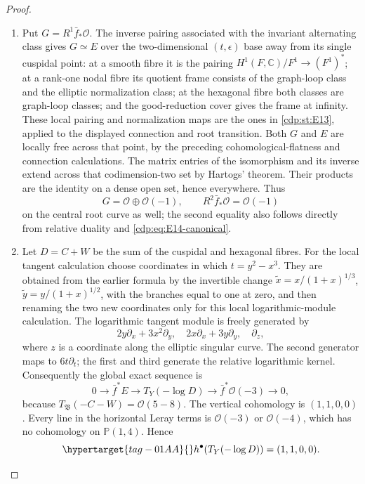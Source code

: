\begin{proof}
\begin{enumerate}[label=\arabic*.,leftmargin=*]
\item Put $G=R^1\bar f_*\mathcal O$. The inverse pairing associated with the invariant alternating
class gives $G\simeq E$ over the two-dimensional $(t,\epsilon)$
base away from its single cuspidal point: at a smooth fibre it is the pairing
$H^1(F,\mathbb C)/F^1\to(F^1)^*$; at a rank-one nodal fibre its quotient
frame consists of the graph-loop class and the elliptic normalization
class; at the hexagonal fibre both classes are graph-loop classes;
and the good-reduction cover gives the frame at infinity.
These local pairing and normalization maps are the ones in
\ref{cdp:st:E13}, applied to the displayed connection and root transition. Both $G$ and $E$ are locally free across that point, by the
preceding cohomological-flatness and connection calculations.
The matrix entries of the isomorphism and its inverse extend
across that codimension-two set by Hartogs' theorem. Their products
are the identity on a dense open set, hence everywhere. Thus
\[
 G=\mathcal O\oplus\mathcal O(-1),\qquad
 R^2\bar f_*\mathcal O=\mathcal O(-1)
\]
on the central root curve as well; the second equality also follows
directly from relative duality and \eqref{cdp:eq:E14-canonical}.

\item Let $D=C+W$ be the sum of the cuspidal and hexagonal fibres.
For the local tangent calculation choose coordinates in which
$t=y^2-x^3$. They are obtained from the earlier formula by the
invertible change $\widetilde x=x/(1+x)^{1/3}$,
$\widetilde y=y/(1+x)^{1/2}$, with the branches equal to one at
zero, and then renaming the two new coordinates only for this local
logarithmic-module calculation. The logarithmic
tangent module is freely generated by
\[
 2y\partial_x+3x^2\partial_y,\quad
 2x\partial_x+3y\partial_y,\quad\partial_z,
\]
where $z$ is a coordinate along the elliptic singular curve. The
second generator maps to $6t\partial_t$;
the first and third generate the relative logarithmic kernel.
Consequently the global exact sequence is
\[
 0\longrightarrow\bar f^*E\longrightarrow T_Y(-\log D)
 \longrightarrow\bar f^*\mathcal O(-3)\longrightarrow0,
\]
because $T_{\mathfrak B}(-C-W)=\mathcal O(5-8)$.
The vertical cohomology is $(1,1,0,0)$. Every line in the
horizontal Leray terms is $\mathcal O(-3)$ or $\mathcal O(-4)$,
which has no cohomology on $\mathbb P(1,4)$. Hence
\begin{equation}\hypertarget{tag-01AA}{}\label{cdp:eq:E14-log-coho}
 h^\bullet(T_Y(-\log D))=(1,1,0,0).
\end{equation}


\end{enumerate}
\end{proof}
